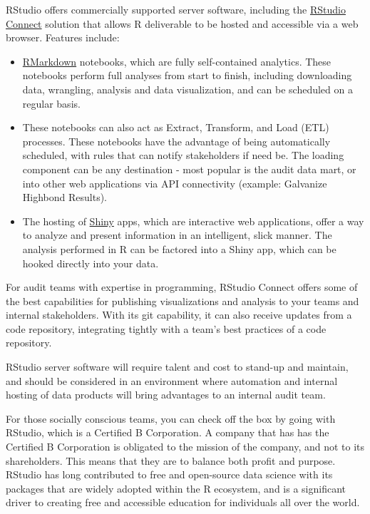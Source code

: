 \documentclass[
]{book}
\providecommand{\tightlist}{%
  \setlength{\itemsep}{0pt}\setlength{\parskip}{0pt}}
\begin{document}
RStudio offers commercially supported server software, including the \href{https://rstudio.com/products/connect/}{RStudio Connect} solution that allows R deliverable to be hosted and accessible via a web browser. Features include:

\begin{itemize}
\tightlist
\item
  \href{https://rmarkdown.rstudio.com}{RMarkdown} notebooks, which are fully self-contained analytics. These notebooks perform full analyses from start to finish, including downloading data, wrangling, analysis and data visualization, and can be scheduled on a regular basis.
\item
  These notebooks can also act as Extract, Transform, and Load (ETL) processes. These notebooks have the advantage of being automatically scheduled, with rules that can notify stakeholders if need be. The loading component can be any destination - most popular is the audit data mart, or into other web applications via API connectivity (example: Galvanize Highbond Results).
\item
  The hosting of \href{https://shiny.rstudio.com}{Shiny} apps, which are interactive web applications, offer a way to analyze and present information in an intelligent, slick manner. The analysis performed in R can be factored into a Shiny app, which can be hooked directly into your data.
\end{itemize}

For audit teams with expertise in programming, RStudio Connect offers some of the best capabilities for publishing visualizations and analysis to your teams and internal stakeholders. With its git capability, it can also receive updates from a code repository, integrating tightly with a team's best practices of a code repository.

RStudio server software will require talent and cost to stand-up and maintain, and should be considered in an environment where automation and internal hosting of data products will bring advantages to an internal audit team.

For those socially conscious teams, you can check off the box by going with RStudio, which is a Certified B Corporation. A company that has has the Certified B Corporation is obligated to the mission of the company, and not to its shareholders. This means that they are to balance both profit and purpose. RStudio has long contributed to free and open-source data science with its packages that are widely adopted within the R ecosystem, and is a significant driver to creating free and accessible education for individuals all over the world.
\end{document}
